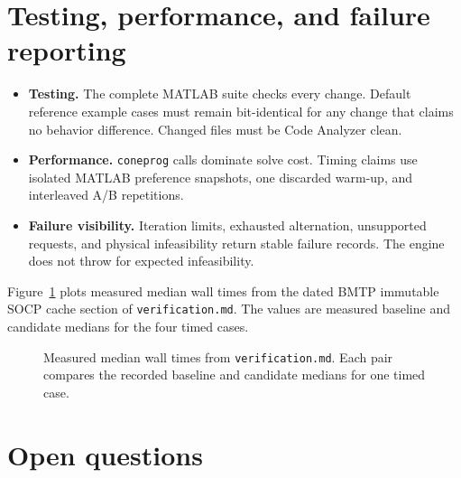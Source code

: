 \documentclass[11pt]{article}
\begin{document}
\section{Testing, performance, and failure reporting}

\begin{itemize}
    \item \textbf{Testing.} The complete MATLAB suite checks every change.
    Default reference example cases must remain bit-identical for any change that claims
    no behavior difference. Changed files must be Code Analyzer clean.
    \item \textbf{Performance.} \texttt{coneprog} calls dominate solve cost. Timing claims use
    isolated MATLAB preference snapshots, one discarded warm-up, and interleaved
    A/B repetitions.
    \item \textbf{Failure visibility.} Iteration limits, exhausted alternation, unsupported
    requests, and physical infeasibility return stable failure records. The
    engine does not throw for expected infeasibility.
\end{itemize}

Figure~\ref{fig:timing} plots measured median wall times from the dated BMTP
immutable SOCP cache section of \texttt{verification.md}. The values are
measured baseline and candidate medians for the four timed cases.
\begin{figure}[ht]\centering
{}
\caption{Measured median wall times from \texttt{verification.md}. Each pair
compares the recorded baseline and candidate medians for one timed case.}
\label{fig:timing}
\end{figure}

\section{Open questions}
\end{document}
